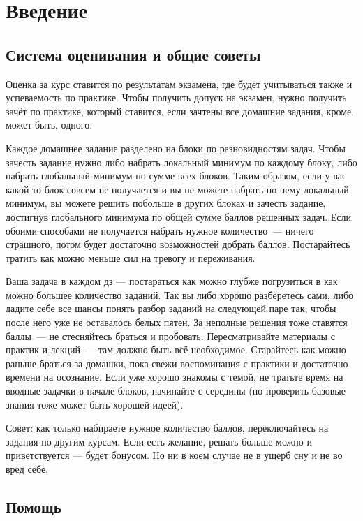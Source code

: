 \documentclass{article}
\begin{document}
    \section*{Введение}

    \subsection*{Система оценивания и общие советы}

    Оценка за курс ставится по результатам экзамена, где будет учитываться также и успеваемость по практике.
    Чтобы получить допуск на экзамен, нужно получить зачёт по практике, который ставится, если зачтены все домашние задания, кроме, может быть, одного.

    Каждое домашнее задание разделено на блоки по разновидностям задач.
    Чтобы зачесть задание нужно либо набрать локальный минимум по каждому блоку, либо набрать глобальный минимум по сумме всех блоков.
    Таким образом, если у вас какой-то блок совсем не получается и вы не можете набрать по нему локальный минимум, вы можете решить побольше в других блоках и зачесть задание, достигнув глобального минимума по общей сумме баллов решенных задач.
    Если обоими способами не получается набрать нужное количество~--- ничего страшного, потом будет достаточно возможностей добрать баллов.
    Постарайтесь тратить как можно меньше сил на тревогу и переживания.

    Ваша задача в каждом дз --- постараться как можно глубже погрузиться в как можно большее количество заданий.
    Так вы либо хорошо разберетесь сами, либо дадите себе все шансы понять разбор заданий на следующей паре так, чтобы после него уже не оставалось белых пятен.
    За неполные решения тоже ставятся баллы~--- не стесняйтесь браться и пробовать.
    Пересматривайте материалы с практик и лекций~--- там должно быть всё необходимое.
    Старайтесь как можно раньше браться за домашки, пока свежи воспоминания с практики и достаточно времени на осознание.
    Если уже хорошо знакомы с темой, не тратьте время на вводные задачки в начале блоков, начинайте с середины (но проверить базовые знания тоже может быть хорошей идеей).

    Совет: как только набираете нужное количество баллов, переключайтесь на задания по другим курсам.
    Если есть желание, решать больше можно и приветствуется --- будет бонусом.
    Но ни в коем случае не в ущерб сну и не во вред себе.

    \subsection*{Помощь}
\end{document}

